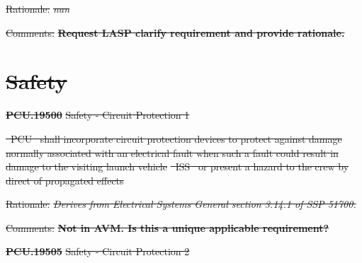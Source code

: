 \documentclass[12pt,oneside,oldfontcommands]{memoir}
\providecommand{\DIFdeltex}[1]{{\protect\color{red}\sout{#1}}}                      %
\providecommand{\DIFdel}[1]{\texorpdfstring{\DIFdeltex{#1}}{}} %
\begin{document}
\begin{itemize}%
\DIFdel{Rationale: }\emph{\DIFdel{nan}}

\DIFdel{Comments: }\textbf{\DIFdel{Request LASP clarify requirement and provide rationale.}}


\end{itemize}%

\section{\DIFdel{Safety}}
\addtocounter{section}{-1}%

\textbf{%
\DIFdel{PCU.19500}%
} %
\DIFdel{Safety - Circuit Protection 1
}%

\DIFdel{\mbox{%
\gls{PCU} }\hspace{0pt}%
shall incorporate circuit protection devices to protect against damage normally associated with an electrical fault when such a fault could result in damage to the visiting launch vehicle}%
\DIFdel{\mbox{%
\gls{ISS} }\hspace{0pt}%
or present a hazard to the crew by direct of propagated effects
}%

\begin{itemize}%
\DIFdel{Rationale: }\emph{\DIFdel{Derives from Electrical Systems General section 3.14.1 of SSP 51700.}}

\DIFdel{Comments: }\textbf{\DIFdel{Not in AVM. Is this a unique applicable requirement?}}


\end{itemize}%

\textbf{%
\DIFdel{PCU.19505}%
} %
\DIFdel{Safety - Circuit Protection 2
}%
\end{document}
